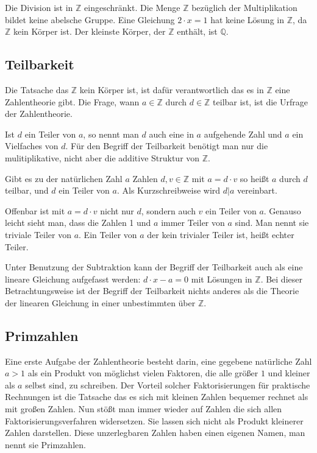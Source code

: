 \documentclass[a4paper,11pt]{article}
\begin{document}
Die Division ist in ${\mathbb Z}$ eingeschränkt. Die Menge ${\mathbb Z}$
bezüglich der Multiplikation bildet keine abelsche Gruppe. Eine
Gleichung $2\cdot x = 1$ hat keine Lösung in ${\mathbb Z}$, da ${\mathbb Z}$
kein Körper ist. Der kleinste Körper, der ${\mathbb Z}$ enthält, ist
${\mathbb Q}$.

\subsection{Teilbarkeit}
Die Tatsache das ${\mathbb Z}$ kein Körper ist, ist dafür verantwortlich
das es in ${\mathbb Z}$ eine Zahlentheorie gibt. Die Frage, wann
$a \in {\mathbb Z}$ durch $d \in {\mathbb Z}$ teilbar ist, ist die Urfrage
der Zahlentheorie.

Ist $d$ ein Teiler von $a$, so nennt man $d$ auch eine in $a$ aufgehende
Zahl und $a$ ein Vielfaches von $d$. Für den Begriff der Teilbarkeit
benötigt man nur die mulitiplikative, nicht aber die additive Struktur
von ${\mathbb Z}$.

Gibt es zu der natürlichen Zahl $a$ Zahlen $d, v \in {\mathbb Z}$ mit
$a = d\cdot v$ so heißt $a$ durch $d$ teilbar, und $d$ ein Teiler von $a$. Als
Kurzschreibweise wird $d|a$ vereinbart.

Offenbar ist mit $a = d\cdot v$ nicht nur $d$, sondern auch $v$ ein Teiler von
$a$. Genauso leicht sieht man, dass die Zahlen 1 und $a$ immer Teiler von
$a$ sind. Man nennt sie triviale Teiler von $a$. Ein Teiler von $a$ der
kein trivialer Teiler ist, heißt echter Teiler.

Unter Benutzung der Subtraktion kann der Begriff der Teilbarkeit auch als
eine lineare Gleichung aufgefasst werden: $d\cdot x - a = 0$ mit Lösungen in
${\mathbb Z}$. Bei dieser Betrachtungsweise ist der Begriff der Teilbarkeit
nichts anderes als die Theorie der linearen Gleichung in einer unbestimmten
über ${\mathbb Z}$.

\subsection{Primzahlen}
Eine erste Aufgabe der Zahlentheorie besteht darin, eine gegebene natürliche
Zahl $a>1$ als ein Produkt von möglichst vielen Faktoren, die alle größer $1$
und kleiner als $a$ selbst sind, zu schreiben. Der Vorteil solcher
Faktorisierungen für praktische Rechnungen ist die Tatsache das es sich mit
kleinen Zahlen bequemer rechnet als mit großen Zahlen. Nun stößt man immer
wieder auf Zahlen die sich allen Faktorisierungsverfahren widersetzen. Sie
lassen sich nicht als Produkt kleinerer Zahlen darstellen. Diese unzerlegbaren
Zahlen haben einen eigenen Namen, man nennt sie Primzahlen.
\end{document}
